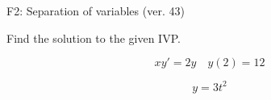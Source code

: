 \begin{exercise}
  \begin{exerciseTitle}F2: Separation of variables (ver. 43)\end{exerciseTitle}
  \begin{exerciseStatement}
    
Find the solution to the given IVP.

    
\[xy'= 2 y \hspace{1em} y( 2 ) = 12\]

  \end{exerciseStatement}
  \begin{exerciseAnswer}
    
\[y= 3 t^ 2\]

  \end{exerciseAnswer}
\end{exercise}